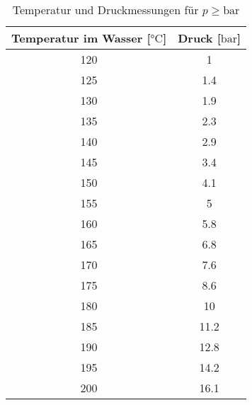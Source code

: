     \begin{table}
        \centering
        \caption{Temperatur und Druckmessungen für $p \geq \si{\bar}$}
        \label{tab:hdd}
        \begin{tabular}{c c}
            \toprule
            Temperatur im Wasser [$\si{\celsius}$] & Druck [$\si{\bar}$] \\
            \midrule
            120 &    1  \\
            125 &    1.4\\
            130 &    1.9\\
            135 &    2.3\\
            140 &    2.9\\
            145 &    3.4\\
            150 &    4.1\\
            155 &    5\\
            160 &    5.8\\
            165 &    6.8\\
            170 &    7.6\\
            175 &    8.6\\
            180 &    10\\
            185 &    11.2   \\
            190 &    12.8   \\
            195 &    14.2   \\
            200 &    16.1   \\
    
            \bottomrule
        \end{tabular}
        \end{table}
